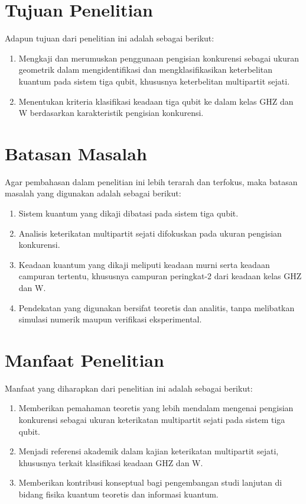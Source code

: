\section{Tujuan Penelitian}
Adapun tujuan dari penelitian ini adalah sebagai berikut:
\begin{enumerate}
    \item Mengkaji dan merumuskan penggunaan pengisian konkurensi sebagai ukuran geometrik dalam mengidentifikasi dan mengklasifikasikan keterbelitan kuantum pada sistem tiga qubit, khususnya keterbelitan multipartit sejati.
    \item Menentukan kriteria klasifikasi keadaan tiga qubit ke dalam kelas GHZ dan W berdasarkan karakteristik pengisian konkurensi.
\end{enumerate}

\section{Batasan Masalah}
Agar pembahasan dalam penelitian ini lebih terarah dan terfokus, maka batasan masalah yang digunakan adalah sebagai berikut:
\begin{enumerate}
    \item Sistem kuantum yang dikaji dibatasi pada sistem tiga qubit.
    \item Analisis keterikatan multipartit sejati difokuskan pada ukuran pengisian konkurensi.
    \item Keadaan kuantum yang dikaji meliputi keadaan murni serta keadaan campuran tertentu, khususnya campuran peringkat-2 dari keadaan kelas GHZ dan W.
    \item Pendekatan yang digunakan bersifat teoretis dan analitis, tanpa melibatkan simulasi numerik maupun verifikasi eksperimental.
\end{enumerate}

\section{Manfaat Penelitian}
Manfaat yang diharapkan dari penelitian ini adalah sebagai berikut:
\begin{enumerate}
    \item Memberikan pemahaman teoretis yang lebih mendalam mengenai pengisian konkurensi sebagai ukuran keterikatan multipartit sejati pada sistem tiga qubit.
    \item Menjadi referensi akademik dalam kajian keterikatan multipartit sejati, khususnya terkait klasifikasi keadaan GHZ dan W.
    \item Memberikan kontribusi konseptual bagi pengembangan studi lanjutan di bidang fisika kuantum teoretis dan informasi kuantum.
\end{enumerate}


